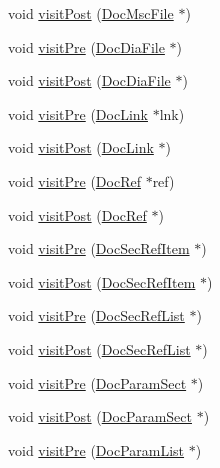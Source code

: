 \begin{DoxyCompactItemize}
\item 
void \hyperlink{class_latex_doc_visitor_af5d4786db60ee85e1fe2b4d6799da3ea}{visit\+Post} (\hyperlink{class_doc_msc_file}{Doc\+Msc\+File} $\ast$)
\item 
void \hyperlink{class_latex_doc_visitor_a67a4ea07d726800009f55c702307e6a1}{visit\+Pre} (\hyperlink{class_doc_dia_file}{Doc\+Dia\+File} $\ast$)
\item 
void \hyperlink{class_latex_doc_visitor_ab4239de98af15926d508347ac6cb9da7}{visit\+Post} (\hyperlink{class_doc_dia_file}{Doc\+Dia\+File} $\ast$)
\item 
void \hyperlink{class_latex_doc_visitor_a2c4a7409f87277bd2cfed2c239cc97af}{visit\+Pre} (\hyperlink{class_doc_link}{Doc\+Link} $\ast$lnk)
\item 
void \hyperlink{class_latex_doc_visitor_ad2a45859fa27ece26cac64b066a9fd80}{visit\+Post} (\hyperlink{class_doc_link}{Doc\+Link} $\ast$)
\item 
void \hyperlink{class_latex_doc_visitor_a2d46293d97e881e7a7e723039dfa41c3}{visit\+Pre} (\hyperlink{class_doc_ref}{Doc\+Ref} $\ast$ref)
\item 
void \hyperlink{class_latex_doc_visitor_a1874c39acf54e64717ac4750230fa14e}{visit\+Post} (\hyperlink{class_doc_ref}{Doc\+Ref} $\ast$)
\item 
void \hyperlink{class_latex_doc_visitor_a1027eeb0bc987e015f97341fc8ccc45e}{visit\+Pre} (\hyperlink{class_doc_sec_ref_item}{Doc\+Sec\+Ref\+Item} $\ast$)
\item 
void \hyperlink{class_latex_doc_visitor_a51acf7f37bb73a45dbca172e687ab0e3}{visit\+Post} (\hyperlink{class_doc_sec_ref_item}{Doc\+Sec\+Ref\+Item} $\ast$)
\item 
void \hyperlink{class_latex_doc_visitor_a53df13e6e02b1b81b1d6434fab02893d}{visit\+Pre} (\hyperlink{class_doc_sec_ref_list}{Doc\+Sec\+Ref\+List} $\ast$)
\item 
void \hyperlink{class_latex_doc_visitor_ace79eaf594dbf803131d113e1da2f3aa}{visit\+Post} (\hyperlink{class_doc_sec_ref_list}{Doc\+Sec\+Ref\+List} $\ast$)
\item 
void \hyperlink{class_latex_doc_visitor_ad14110ee968c95cec224b0d4953dd6fa}{visit\+Pre} (\hyperlink{class_doc_param_sect}{Doc\+Param\+Sect} $\ast$)
\item 
void \hyperlink{class_latex_doc_visitor_a85552c43be8c41ebe41848d18f1cea3c}{visit\+Post} (\hyperlink{class_doc_param_sect}{Doc\+Param\+Sect} $\ast$)
\item 
void \hyperlink{class_latex_doc_visitor_adbff15c25ec6500e5d6f7be1b108af82}{visit\+Pre} (\hyperlink{class_doc_param_list}{Doc\+Param\+List} $\ast$)

\end{DoxyCompactItemize}
